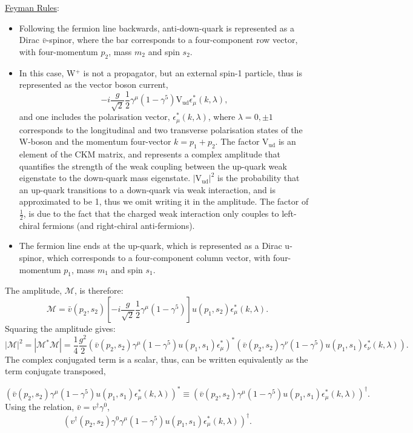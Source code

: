 \documentclass[a4paper,11pt]{article}
\begin{document}
\underline{Feyman Rules}:
\begin{itemize}
	\item Following the fermion line backwards, anti-down-quark is represented as a Dirac $\bar{v}$-spinor, where the bar corresponds to a four-component row vector, with four-momentum $p_2$, mass $m_2$ and spin $s_2$.
	\item In this case, W$^+$ is not a propagator, but an external spin-1 particle, thus is represented as the vector boson current, $$-i\frac{g}{\sqrt{2}}\frac{1}{2}\gamma^\mu (1-\gamma^5)\text{V}_\text{ud}\epsilon_\mu^*(k, \lambda),$$ and one includes the polarisation vector, $\epsilon_\mu^*(k, \lambda)$, where $\lambda = 0, \pm1$ corresponds to the longitudinal and two transverse polarisation states of the W-boson and the momentum four-vector $k  = p_1 +p_2$. The factor $\text{V}_\text{ud}$ is an element of the CKM matrix, and represents a complex amplitude that quantifies the strength of the weak coupling between the up-quark weak eigenstate to the down-quark mass eigenstate. $|\text{V}_\text{ud}|^2$ is the probability that an up-quark transitions to a down-quark via weak interaction, and is approximated to be 1, thus we omit writing it in the amplitude. The factor of $\frac{1}{2}$, is due to the fact that the charged weak interaction only couples to left-chiral fermions (and right-chiral anti-fermions).
	\item  The fermion line ends at the up-quark, which is represented as a Dirac u-spinor, which corresponds to a four-component column vector, with four-momentum $p_1$, mass $m_1$ and spin $s_1$.
\end{itemize}	
 The amplitude, $\mathcal{M}$, is therefore: $$\mathcal{M} = \bar{v}(p_2, s_2) 	\left[-i\frac{g}{\sqrt{2}}\frac{1}{2}\gamma^\mu (1-\gamma^5) \right] u(p_1, s_2) \epsilon_\mu^{*}(k, \lambda).$$ Squaring the amplitude gives: $$ |\mathcal{M}|^2= |\mathcal{M}^*\mathcal{M}| = \frac{1}{4} \frac{g^2}{2} \left(\bar{v}(p_2, s_2)\gamma^\mu (1-\gamma^5) u(p_1, s_1) \epsilon_\mu^* \right)^* \left(\bar{v}(p_2, s_2)\gamma^\nu (1-\gamma^5) u(p_1, s_1) \epsilon_\nu^*(k, \lambda) \right).$$ The complex conjugated term is a scalar, thus, can be written equivalently as the term conjugate transposed,
 
  $$ \left(\bar{v}(p_2, s_2)\gamma^\mu (1-\gamma^5) u(p_1,  s_1) \epsilon_\mu^*(k, \lambda) \right)^* \equiv \left(\bar{v}(p_2, s_2)\gamma^\mu (1-\gamma^5) u(p_1, s_1) \epsilon_\mu^*(k, \lambda) \right)^\dagger. $$ Using the relation, $\bar{v}=v^\dagger \gamma^0$, 
  $$ \left(v^\dagger(p_2, s_2)\gamma^0 \gamma^\mu (1-\gamma^5) u(p_1, s_1) \epsilon_\mu^*(k, \lambda) \right)^\dagger.$$
  
\end{document}

